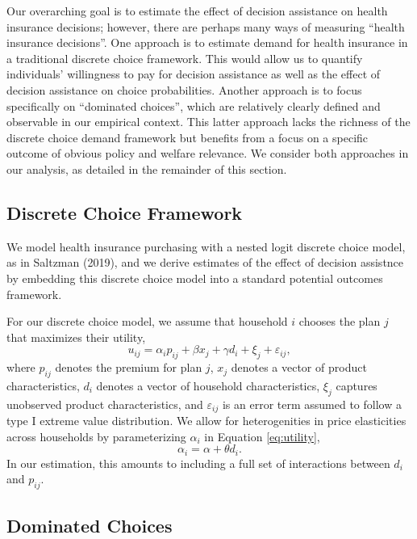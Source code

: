 \documentclass[
  12pt,
]{article}
\begin{document}
Our overarching goal is to estimate the effect of decision assistance on health insurance decisions; however, there are perhaps many ways of measuring ``health insurance decisions''. One approach is to estimate demand for health insurance in a traditional discrete choice framework. This would allow us to quantify individuals' willingness to pay for decision assistance as well as the effect of decision assistance on choice probabilities. Another approach is to focus specifically on ``dominated choices'', which are relatively clearly defined and observable in our empirical context. This latter approach lacks the richness of the discrete choice demand framework but benefits from a focus on a specific outcome of obvious policy and welfare relevance. We consider both approaches in our analysis, as detailed in the remainder of this section.

\hypertarget{discrete-choice-framework}{%
\subsection{Discrete Choice Framework}\label{discrete-choice-framework}}

We model health insurance purchasing with a nested logit discrete choice model, as in Saltzman (2019), and we derive estimates of the effect of decision assistnce by embedding this discrete choice model into a standard potential outcomes framework.

For our discrete choice model, we assume that household \(i\) chooses the plan \(j\) that maximizes their utility,
\begin{equation}
u_{ij} = \alpha_{i}p_{ij} + \beta x_{j} + \gamma d_{i} + \xi_{j} + \varepsilon_{ij}, \label{eq:utility}
\end{equation}
where \(p_{ij}\) denotes the premium for plan \(j\), \(x_{j}\) denotes a vector of product characteristics, \(d_{i}\) denotes a vector of household characteristics, \(\xi_{j}\) captures unobserved product characteristics, and \(\varepsilon_{ij}\) is an error term assumed to follow a type I extreme value distribution. We allow for heterogenities in price elasticities across households by parameterizing \(\alpha_{i}\) in Equation \eqref{eq:utility}, \[\alpha_{i} = \alpha + \theta d_{i}.\] In our estimation, this amounts to including a full set of interactions between \(d_{i}\) and \(p_{ij}\).

\hypertarget{dominated-choices}{%
\subsection{Dominated Choices}\label{dominated-choices}}
\end{document}
